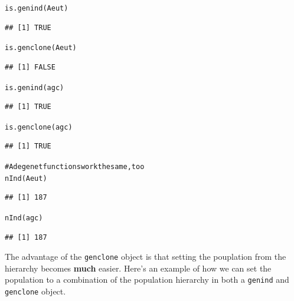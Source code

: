 \documentclass[letterpaper]{article}\usepackage[]{graphicx}\usepackage[]{color}
\makeatletter
\newcommand{\hlcom}[1]{\textcolor[rgb]{1,0.502,0}{#1}}%
\newcommand{\hlstd}[1]{\textcolor[rgb]{0,0,0}{#1}}%
\newcommand{\hlkwd}[1]{\textcolor[rgb]{0,0.267,0.4}{#1}}%
\newenvironment{kframe}{%
 \def\at@end@of@kframe{}%
 \ifinner\ifhmode%
  \def\at@end@of@kframe{\end{minipage}}%
  \begin{minipage}{\columnwidth}%
 \fi\fi%
 \def\FrameCommand##1{\hskip\@totalleftmargin \hskip-\fboxsep
 \colorbox{shadecolor}{##1}\hskip-\fboxsep
     \hskip-\linewidth \hskip-\@totalleftmargin \hskip\columnwidth}%
 \MakeFramed {\advance\hsize-\width
   \@totalleftmargin\z@ \linewidth\hsize
   \@setminipage}}%
 {\par\unskip\endMakeFramed%
 \at@end@of@kframe}
\newenvironment{knitrout}{}{} %
\makeatother
\begin{document}
\begin{knitrout}\footnotesize
{}\color{fgcolor}\begin{kframe}
\begin{alltt}
\hlkwd{is.genind}\hlstd{(Aeut)}
\end{alltt}
\begin{verbatim}
## [1] TRUE
\end{verbatim}
\begin{alltt}
\hlkwd{is.genclone}\hlstd{(Aeut)}
\end{alltt}
\begin{verbatim}
## [1] FALSE
\end{verbatim}
\begin{alltt}
\hlkwd{is.genind}\hlstd{(agc)}
\end{alltt}
\begin{verbatim}
## [1] TRUE
\end{verbatim}
\begin{alltt}
\hlkwd{is.genclone}\hlstd{(agc)}
\end{alltt}
\begin{verbatim}
## [1] TRUE
\end{verbatim}
\begin{alltt}
\hlcom{# Adegenet functions work the same, too}
\hlkwd{nInd}\hlstd{(Aeut)}
\end{alltt}
\begin{verbatim}
## [1] 187
\end{verbatim}
\begin{alltt}
\hlkwd{nInd}\hlstd{(agc)}
\end{alltt}
\begin{verbatim}
## [1] 187
\end{verbatim}
\end{kframe}
\end{knitrout}


The advantage of the \texttt{genclone} object is that setting the pouplation
from the hierarchy becomes \textbf{much} easier. Here's an example of how we can
set the population to a combination of the population hierarchy in both a
\texttt{genind} and \texttt{genclone} object. 
\end{document}
